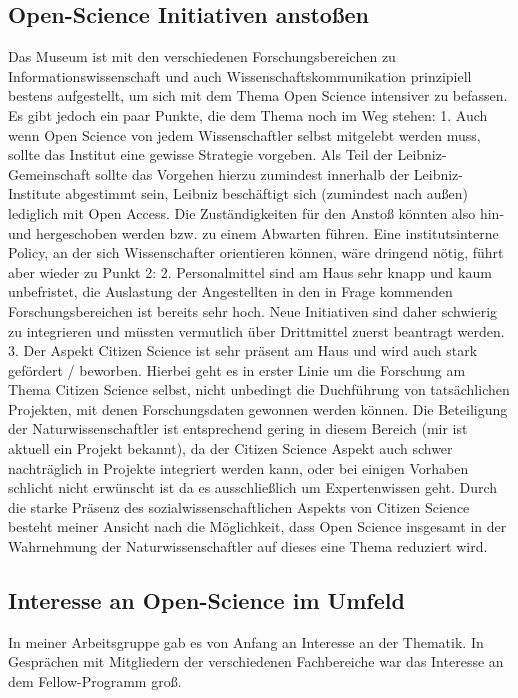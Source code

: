 \documentclass[11pt,a4paper]{article}
\begin{document}
\subsection{Open-Science Initiativen anstoßen}
Das Museum ist mit den verschiedenen Forschungsbereichen zu Informationswissenschaft und auch Wissenschaftskommunikation prinzipiell bestens aufgestellt, um sich mit dem Thema Open Science intensiver zu befassen. Es gibt jedoch ein paar Punkte, die dem Thema noch im Weg stehen:
1. Auch wenn Open Science von jedem Wissenschaftler selbst mitgelebt werden muss, sollte das Institut eine gewisse Strategie vorgeben. Als Teil der Leibniz-Gemeinschaft sollte das Vorgehen hierzu zumindest innerhalb der Leibniz-Institute abgestimmt sein, Leibniz beschäftigt sich (zumindest nach außen) lediglich mit Open Access. Die Zuständigkeiten für den Anstoß könnten also hin- und hergeschoben werden bzw. zu einem Abwarten führen. Eine institutsinterne Policy, an der sich Wissenschafter orientieren können, wäre dringend nötig, führt aber wieder zu Punkt 2:
2. Personalmittel sind am Haus sehr knapp und kaum unbefristet, die Auslastung der Angestellten in den in Frage kommenden Forschungsbereichen ist bereits sehr hoch. Neue Initiativen sind daher schwierig zu integrieren und müssten vermutlich über Drittmittel zuerst beantragt werden.
3.  Der Aspekt Citizen Science ist sehr präsent am Haus und wird auch stark gefördert / beworben. Hierbei geht es in erster Linie um die Forschung am Thema Citizen Science selbst, nicht unbedingt die Duchführung von tatsächlichen Projekten, mit denen Forschungsdaten gewonnen werden können. Die Beteiligung der Naturwissenschaftler ist entsprechend gering in diesem Bereich (mir ist aktuell ein Projekt bekannt), da der Citizen Science Aspekt auch schwer nachträglich in Projekte integriert werden kann, oder bei einigen Vorhaben schlicht nicht erwünscht ist da es ausschließlich um Expertenwissen geht. Durch die starke Präsenz des sozialwissenschaftlichen Aspekts von Citizen Science besteht meiner Ansicht nach die Möglichkeit, dass Open Science insgesamt in der Wahrnehmung der Naturwissenschaftler auf dieses eine Thema reduziert wird.


\subsection{Interesse an Open-Science im Umfeld} %
In meiner Arbeitsgruppe gab es von Anfang an Interesse an der Thematik. In Gesprächen mit Mitgliedern der verschiedenen Fachbereiche war das Interesse an dem Fellow-Programm groß.
\end{document}
